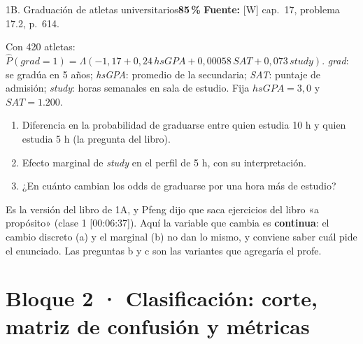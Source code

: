 \documentclass[11pt]{article}
\newcommand{\prob}[1]{\colorbox{red!15}{\textbf{#1}}}
\newcommand{\fuente}[1]{{\small\textcolor{blue!50!black}{\textbf{Fuente:} #1}}\par}
\newcommand{\bloque}[2]{\section*{Bloque #1 · #2}}
\begin{document}
\begin{ej}{1B. Graduación de atletas universitarios}{\prob{85\,\%}}
\fuente{[W] cap.~17, problema 17.2, p.~614.}
Con 420 atletas: $\hat P(grad=1)=\Lambda(-1{,}17+0{,}24\,hsGPA+0{,}00058\,SAT+0{,}073\,study)$. \emph{grad}: se gradúa en 5 años; \emph{hsGPA}: promedio de la secundaria; \emph{SAT}: puntaje de admisión; \emph{study}: horas semanales en sala de estudio. Fija $hsGPA=3{,}0$ y $SAT=1.200$.
\begin{enumerate}[label=\alph*),itemsep=0pt,topsep=2pt]
\item Diferencia en la probabilidad de graduarse entre quien estudia 10 h y quien estudia 5 h (la pregunta del libro).
\item Efecto marginal de \emph{study} en el perfil de 5 h, con su interpretación.
\item ¿En cuánto cambian los odds de graduarse por una hora más de estudio?
\end{enumerate}
\end{ej}
\begin{porque}
Es la versión del libro de 1A, y Pfeng dijo que saca ejercicios del libro «a propósito» (clase 1 [00:06:37]). Aquí la variable que cambia es \textbf{continua}: el cambio discreto (a) y el marginal (b) no dan lo mismo, y conviene saber cuál pide el enunciado. Las preguntas b y c son las variantes que agregaría el profe.
\end{porque}

\bloque{2}{Clasificación: corte, matriz de confusión y métricas}
\end{document}
